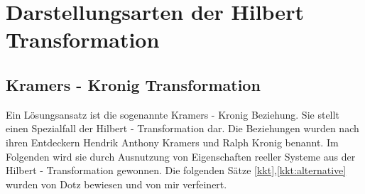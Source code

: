 \section{Darstellungsarten der Hilbert Transformation}\label{kkt:darstellung}
\subsection{Kramers - Kronig Transformation}
Ein Lösungsansatz ist die sogenannte Kramers - Kronig Beziehung. Sie stellt einen Spezialfall der Hilbert - Transformation dar. Die Beziehungen wurden nach ihren Entdeckern Hendrik Anthony Kramers und Ralph Kronig benannt. Im Folgenden wird sie durch Ausnutzung von Eigenschaften reeller Systeme aus der Hilbert - Transformation gewonnen. Die folgenden Sätze \ref{kkt},\ref{kkt:alternative} wurden von Dotz \cite{Dotz2012} bewiesen und von mir verfeinert.
